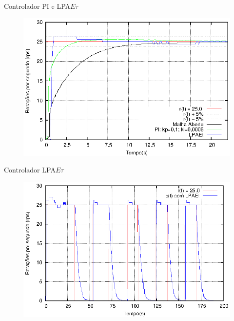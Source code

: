 \begin{frame}{Controlador PI e LPA$E\tau$}

\vspace{-0.5cm}
\begin{figure}[!htb]
\center\includegraphics[scale=1.0]{./plot/resAcaoPI.eps}
\label{fig:resAcaoPI}

\end{figure}


\end{frame}


\begin{frame}{Controlador LPA$E\tau$}

\vspace{-0.5cm}
\begin{figure}[!htb]
\center\includegraphics[scale=1.0]{./plot/LPAEt-delta.eps}
\label{fig:lpaetDelta}

\end{figure}


\end{frame}



